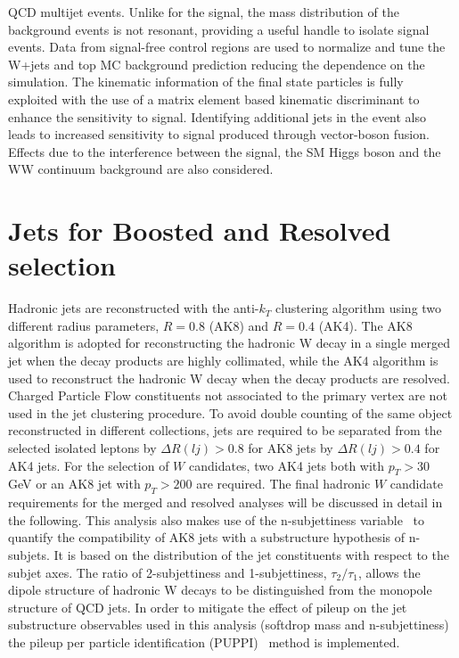 QCD multijet events. Unlike for the signal, the mass distribution of the background events is
not resonant, providing a useful handle to isolate signal events. Data from signal-free control
regions are used to normalize and tune the W+jets and top MC background prediction reducing
the dependence on the simulation.
The kinematic information of the final state particles is fully exploited with the use of a matrix
element based kinematic discriminant to enhance the sensitivity to signal. Identifying additional jets in the event also leads to increased sensitivity to signal produced through vector-boson fusion. Effects due to the interference between the signal, the SM Higgs boson and the WW continuum background are also considered.

\section{Jets for Boosted and Resolved selection}
Hadronic jets are reconstructed with the anti-$k_T$ clustering algorithm  using two different
radius parameters, $R = 0.8$ (AK8) and $R = 0.4$ (AK4). The AK8 algorithm is adopted for
reconstructing the hadronic W decay in a single merged jet when the decay products are highly
collimated, while the AK4 algorithm is used to reconstruct the hadronic W decay when the
decay products are resolved.
Charged Particle Flow
constituents not associated to the primary vertex are not used in the jet clustering procedure.
To avoid double counting of the same object
reconstructed in different collections, jets are required to be separated from the selected isolated
leptons by $\Delta R(lj)> 0.8 $ for AK8 jets by  $\Delta R(lj)> 0.4$ for AK4 jets.
For the selection of $W$ candidates, two AK4 jets both with $p_T>30$ GeV or an AK8 jet with  $p_T>200$ are required.
The final hadronic $W$ candidate requirements for the merged and resolved analyses
will be discussed in detail in the following.
This analysis also makes use of the n-subjettiness variable~\cite{Thaler:2011gf}  to quantify the compatibility
of AK8 jets with a substructure hypothesis of n-subjets. It is based on the distribution of the
jet constituents with respect to the subjet axes. The ratio of 2-subjettiness and 1-subjettiness,
 $\tau_2 /\tau_1$, allows the dipole structure of hadronic W decays to be distinguished from the monopole
structure of QCD jets.
In order to mitigate the effect of pileup on the jet substructure observables used in this analysis
(softdrop mass and n-subjettiness) the pileup per particle identification (PUPPI)~\cite{Bertolini2014} method is
implemented.

